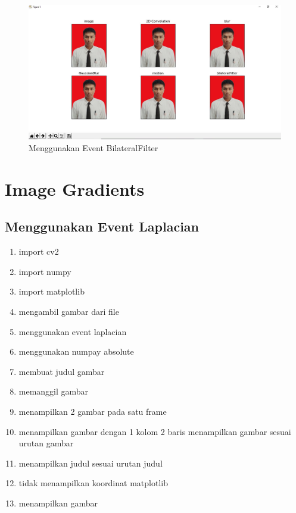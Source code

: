\begin{figure}[ht]
\centering
\includegraphics[scale=0.32]{figures/2,63.jpg}
\caption{Menggunakan Event BilateralFilter}
\label{contoh}
\end{figure}






\newpage
\section{Image Gradients}
\subsection{Menggunakan Event Laplacian}

\begin{enumerate}
	\item import cv2
	\item import numpy
	\item import matplotlib
	\item mengambil gambar dari file
	\item menggunakan event laplacian
	\item menggunakan numpay absolute
	\item membuat judul gambar
	\item memanggil gambar
	\item menampilkan 2 gambar pada satu frame
	\item menampilkan gambar dengan 1 kolom 2 baris menampilkan gambar sesuai urutan gambar
	\item menampilkan judul sesuai urutan judul
	\item tidak menampilkan koordinat matplotlib
	\item menampilkan gambar
\end{enumerate}

